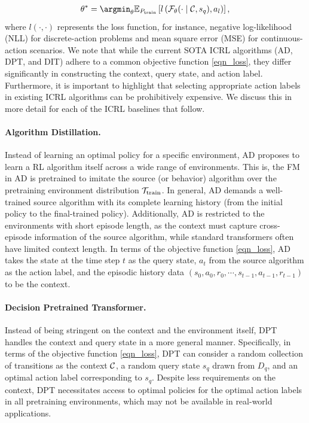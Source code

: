 %
\begin{align}\label{eqn_loss}
    \theta^* = \argmin_\theta \mbE_{P_{\text{train}}} \left[ l \left( \ccalF_\theta(\cdot \mid \ccalC, s_{q}), a_{l}\right) \right],
\end{align}
%
where $l(\cdot, \cdot)$ represents the loss function, for instance, negative log-likelihood (NLL) for discrete-action problems and mean square error (MSE) for continuous-action scenarios.
%
We note that while the current SOTA ICRL algorithms (AD, DPT, and DIT) adhere to a common objective function \eqref{eqn_loss}, they differ significantly in constructing the context, query state, and action label.
%
Furthermore, it is important to highlight that selecting appropriate action labels in existing ICRL algorithms can be prohibitively expensive. We discuss this in more detail for each of the ICRL baselines  that follow.





\paragraph{Algorithm Distillation.} Instead of learning an optimal policy for a specific environment, AD proposes to learn a RL algorithm itself across a wide range of environments. This is, the FM in AD is pretrained to imitate the source (or behavior) algorithm over the pretraining environment distribution ${\mathcal T}_{\text{train}}$. In general, AD demands a well-trained source algorithm with its complete learning history (from the initial policy to the final-trained policy). Additionally, AD is restricted to the environments with short episode length, as the context must capture cross-episode information of the source algorithm, while standard transformers often have limited context length.
%
In terms of the objective function \eqref{eqn_loss}, AD takes the state at the time step $t$ as the query state, $a_t$ from the source algorithm as the action label, and the episodic history data $(s_0, a_0, r_0, \cdots, s_{t-1}, a_{t-1}, r_{t-1})$ to be the context.
%





\paragraph{Decision Pretrained Transformer.} 
%
Instead of being stringent on the context and the environment itself, DPT handles the context and query state in a more general manner.
%
Specifically, in terms of the objective function \eqref{eqn_loss}, DPT can consider a random collection of transitions as the context ${\mathcal C}$, a random query state $s_q$ drawn from $D_q$, and an optimal action label corresponding to $s_q$.
%
Despite less requirements on the context, DPT necessitates access to optimal policies for the optimal action labels in all pretraining environments, which may not be available in real-world applications.






